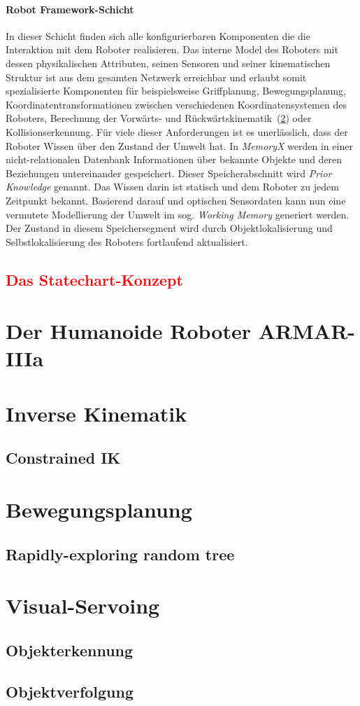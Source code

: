 \paragraph{\glqq Robot Framework\grqq -Schicht} In dieser Schicht finden sich alle konfigurierbaren Komponenten die die Interaktion mit dem Roboter realisieren. Das interne Model des Roboters mit dessen physikalischen Attributen, seinen Sensoren und seiner kinematischen Struktur ist aus dem gesamten Netzwerk erreichbar und erlaubt somit spezialisierte Komponenten für beispielsweise Griffplanung, Bewegungsplanung, Koordinatentransformationen zwischen verschiedenen Koordinatensystemen des Roboters, Berechnung der Vorwärts- und Rückwärtskinematik~(\ref{sec:InverseKinematik}) oder Kollisionserkennung. Für viele dieser Anforderungen ist es unerlässlich, dass der Roboter Wissen über den Zustand der Umwelt hat. In \textit{MemoryX} werden in einer nicht-relationalen Datenbank Informationen über bekannte Objekte und deren Beziehungen untereinander gespeichert. Dieser Speicherabschnitt wird \textit{Prior Knowledge} genannt. Das Wissen darin ist statisch und dem Roboter zu jedem Zeitpunkt bekannt. Basierend darauf und optischen Sensordaten kann nun eine vermutete Modellierung der Umwelt im sog. \textit{Working Memory} generiert werden. Der Zustand in diesem Speichersegment wird durch Objektlokalisierung und Selbstlokalisierung des Roboters fortlaufend aktualisiert. \\



\subsection{\textcolor{red}{Das Statechart-Konzept}}\label{sec:Statechart_concept}

\section{Der Humanoide Roboter ARMAR-IIIa}

\section{Inverse Kinematik}\label{sec:InverseKinematik}
\subsection{Constrained IK}\label{sec:ConstrainedIK}

\section{Bewegungsplanung} \label{sec:Bewegungsplanung}
\subsection{Rapidly-exploring random tree}

\section{Visual-Servoing}
\subsection{Objekterkennung}
\subsection{Objektverfolgung}